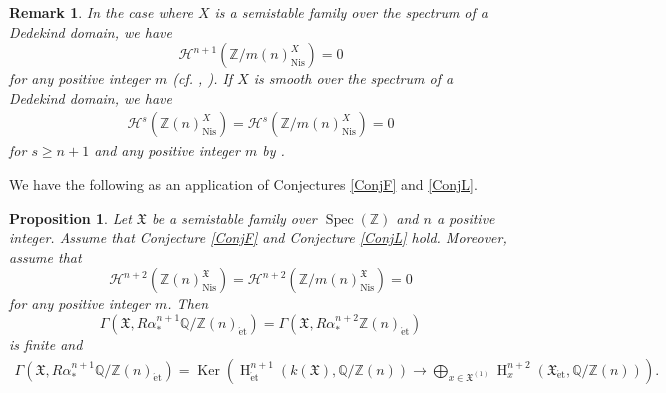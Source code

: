 \documentclass{article}
\newtheorem{prop}[thm]{\indent \sc Proposition}
\newtheorem{rem}[thm]{\indent \sc Remark}
\newcommand{\spec}{\operatorname{Spec}}
\newcommand{\et}{\mathrm{\acute{e}t}}
\newcommand{\Nis}{\mathrm{Nis}}
\newcommand{\HO}{\operatorname{H}}
\begin{document}
%
\begin{rem}\upshape\label{ReSem}
In the case where $X$ is a semistable family over
the spectrum of a Dedekind domain, we have
%
\begin{equation*}
\mathcal{H}^{n+1}(
\mathbb{Z}/m(n)_{\Nis}^{X}
)    
=0
\end{equation*}
%
for any positive integer $m$ (cf. \cite[Proposition 4.5]{Sak4}, \cite[Remark 4.7]{Sak4}).
If $X$ is smooth over the spectrum of a Dedekind domain, we have
%
\begin{align*}
\mathcal{H}^{s}(
\mathbb{Z}(n)^{X}_{\Nis}
)
=
\mathcal{H}^{s}(
\mathbb{Z}/m(n)^{X}_{\Nis}
)
=0
\end{align*}
%
for $s\geq n+1$
and any positive integer $m$ by \cite[p.786, Corollary 4.4]{Ge}.
\end{rem}
%


We have the following as an application of Conjectures \ref{ConjF}
and \ref{ConjL}.

%
\begin{prop}\upshape\label{Appconj}
Let $\mathfrak{X}$ be a semistable family over $\spec(\mathbb{Z})$ and $n$ a positive integer.
Assume that Conjecture \ref{ConjF} and Conjecture \ref{ConjL} hold. Moreover, assume that 
%
\begin{equation*}
\mathcal{H}^{n+2}(\mathbb{Z}(n)_{\Nis}^{\mathfrak{X}})
=
\mathcal{H}^{n+2}(\mathbb{Z}/m(n)_{\Nis}^{\mathfrak{X}})
=0
\end{equation*}
%
for any positive integer $m$.
Then 
%
\begin{equation}\label{QZu}
\Gamma\left(
\mathfrak{X},
R\alpha_{*}^{n+1}
\mathbb{Q}/\mathbb{Z}(n)_{\et}
\right)
=
\Gamma\left(
\mathfrak{X},
R\alpha_{*}^{n+2}
\mathbb{Z}(n)_{\et}
\right)
\end{equation}
%
is finite and 
%
\begin{align}\label{glger}
\Gamma\left(
\mathfrak{X},
R\alpha_{*}^{n+1}
\mathbb{Q}/\mathbb{Z}(n)_{\et}
\right)
=
\operatorname{Ker}
\left(
\HO^{n+1}_{\et}(
k(\mathfrak{X}),
\mathbb{Q}/\mathbb{Z}(n)
)
\to
\bigoplus_{x\in \mathfrak{X}^{(1)}}
\HO^{n+2}_{x}(
\mathfrak{X}_{\et},
\mathbb{Q}/\mathbb{Z}(n)
)
\right).
\end{align}
%
\end{prop}
%
\end{document}

